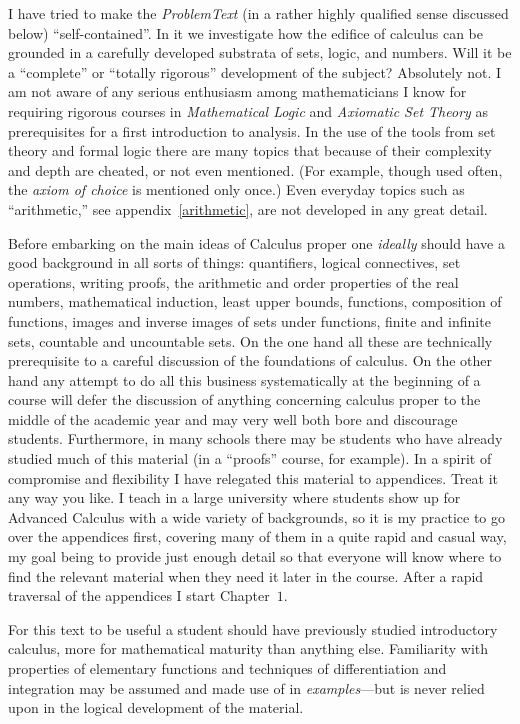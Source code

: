 I have tried to make the \emph{ProblemText} (in a rather highly qualified sense discussed
below) ``self-contained''. In it we investigate how the edifice of calculus can be
grounded in a carefully developed substrata of sets, logic, and numbers.  Will it be a
``complete'' or ``totally rigorous'' development of the subject? Absolutely not.  I am
not aware of any serious enthusiasm among mathematicians I know for requiring rigorous
courses in \emph{Mathematical Logic} and \emph{Axiomatic Set Theory} as prerequisites for
a first introduction to analysis.  In the use of the tools from set theory and formal
logic there are many topics that because of their complexity and depth are cheated, or
not even mentioned. (For example, though used often, the \emph{axiom of choice} is
mentioned only once.) Even everyday topics such as ``arithmetic,'' see
appendix~\ref{arithmetic}, are not developed in any great detail.

Before embarking on the main ideas of Calculus proper one \emph{ideally} should have a
good background in all sorts of things: quantifiers, logical connectives, set operations,
writing proofs, the arithmetic and order properties of the real numbers, mathematical
induction, least upper bounds, functions, composition of functions, images and inverse
images of sets under functions, finite and infinite sets, countable and uncountable sets.
On the one hand all these are technically prerequisite to a careful discussion of the
foundations of calculus. On the other hand any attempt to do all this business
systematically at the beginning of a course will defer the discussion of anything
concerning calculus proper to the middle of the academic year and may very well both bore
and discourage students.  Furthermore, in many schools there may be students who have
already studied much of this material (in a ``proofs'' course, for example). In a spirit
of compromise and flexibility I have relegated this material to appendices. Treat it any
way you like.  I teach in a large university where students show up for Advanced Calculus
with a wide variety of backgrounds, so it is my practice to go over the appendices first,
covering many of them in a quite rapid and casual way, my goal being to provide just
enough detail so that everyone will know where to find the relevant material when they
need it later in the course.  After a rapid traversal of the appendices I start
Chapter~$1$.

For this text to be useful a student should have previously studied introductory
calculus, more for mathematical maturity than anything else.  Familiarity with properties
of elementary functions and techniques of differentiation and integration may be assumed
and made use of in \emph{examples}---but is never relied upon in the logical development
of the material.

